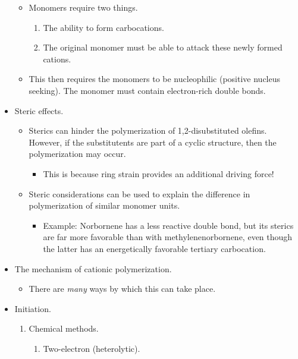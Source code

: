 \documentclass[../notes.tex]{subfiles}
\begin{document}
\begin{itemize}
\begin{itemize}
        \item Monomers require two things.
        \begin{enumerate}
            \item The ability to form carbocations.
            \item The original monomer must be able to attack these newly formed cations.
        \end{enumerate}
        \item This then requires the monomers to be nucleophilic (positive nucleus seeking). The monomer must contain electron-rich double bonds.
    \end{itemize}
    \item Steric effects.
    \begin{itemize}
        \item Sterics can hinder the polymerization of 1,2-disubstituted olefins. However, if the substitutents are part of a cyclic structure, then the polymerization may occur.
        \begin{itemize}
            \item This is because ring strain provides an additional driving force!
        \end{itemize}
        \item Steric considerations can be used to explain the difference in polymerization of similar monomer units.
        \begin{itemize}
            \item Example: Norbornene has a less reactive double bond, but its sterics are far more favorable than with methylenenorbornene, even though the latter has an energetically favorable tertiary carbocation.
        \end{itemize}
    \end{itemize}
    \item The mechanism of cationic polymerization.
    \begin{itemize}
        \item There are \emph{many} ways by which this can take place.
    \end{itemize}
    \item Initiation.
    \begin{enumerate}
        \item Chemical methods.
        \begin{enumerate}
            \item Two-electron (heterolytic).
            \begin{enumerate}

\end{enumerate}
\end{enumerate}
\end{enumerate}
\end{itemize}
\end{document}
